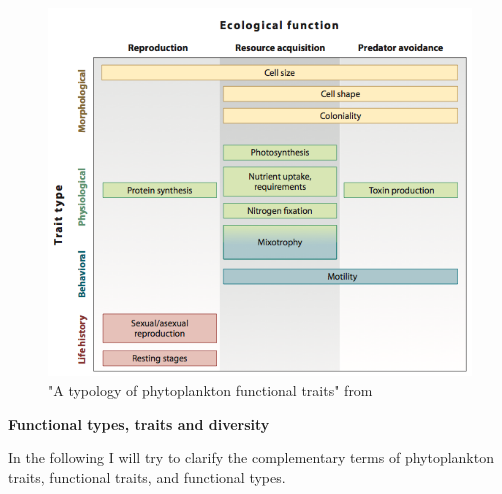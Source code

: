 \begin{figure}
\centering
\includegraphics[width=0.7\linewidth]{./Chp1-Intro/Fig_litchman2008.png}
\caption[Scheme]{\small{"A typology of phytoplankton functional traits" from \cite{Litchman2008}}} %
\label{PhytoTraits}
\end{figure}

{\textbf{Functional types, traits and diversity}}


In the following I will try to clarify the complementary terms
of phytoplankton traits, functional traits, and functional types. 

